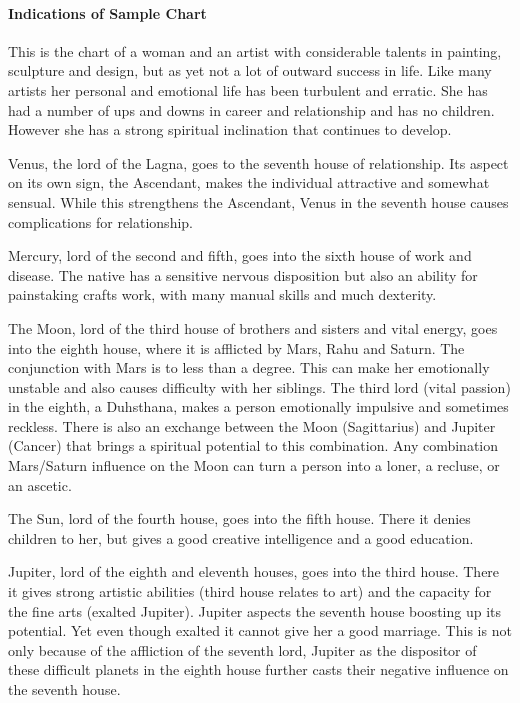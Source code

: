 \paragraph{Indications of Sample Chart}

 

This is the chart of a woman and an artist with considerable talents in painting, sculpture and design, but as yet not a lot of outward success in life. Like many artists her personal and emotional life has been turbulent and erratic. She has had a number of ups and downs in career and relationship and has no children. However she has a strong spiritual inclination that continues to develop.

 

Venus, the lord of the Lagna, goes to the seventh house of relationship. Its aspect on its own sign, the Ascendant, makes the individual attractive and somewhat sensual. While this strengthens the Ascendant, Venus in the seventh house causes complications for relationship.

 

Mercury, lord of the second and fifth, goes into the sixth house of work and disease. The native has a sensitive nervous disposition but also an ability for painstaking crafts work, with many manual skills and much dexterity.

 

The Moon, lord of the third house of brothers and sisters and vital energy, goes into the eighth house, where it is afflicted by Mars, Rahu and Saturn. The conjunction with Mars is to less than a degree. This can make her emotionally unstable and also causes difficulty with her siblings. The third lord (vital passion) in the eighth, a Duhsthana, makes a person emotionally impulsive and sometimes reckless. There is also an exchange between the Moon (Sagittarius) and Jupiter (Cancer) that brings a spiritual potential to this combination. Any combination Mars/Saturn influence on the Moon can turn a person into a loner, a recluse, or an ascetic.

 

The Sun, lord of the fourth house, goes into the fifth house. There it denies children to her, but gives a good creative intelligence and a good education.

 

Jupiter, lord of the eighth and eleventh houses, goes into the third house. There it gives strong artistic abilities (third house relates to art) and the capacity for the fine arts (exalted Jupiter). Jupiter aspects the seventh house boosting up its potential. Yet even though exalted it cannot give her a good marriage. This is not only because of the affliction of the seventh lord, Jupiter as the dispositor of these difficult planets in the eighth house further casts their negative influence on the seventh house.

